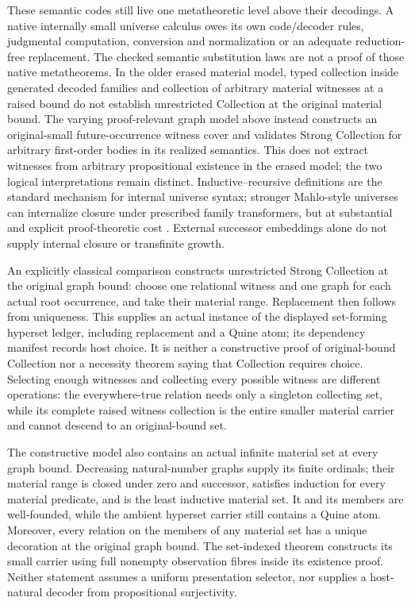 \documentclass[11pt]{article}
\theoremstyle{definition}
\theoremstyle{remark}
\begin{document}
These semantic codes still live one metatheoretic level above their decodings.
A native internally small universe calculus owes its own code/decoder rules,
judgmental computation, conversion and normalization or an adequate
reduction-free replacement.  The checked semantic substitution laws are not a
proof of those native metatheorems.  In the older erased material model, typed
collection inside generated decoded families and collection of arbitrary
material witnesses at a raised bound do not establish unrestricted Collection
at the original material bound.  The varying proof-relevant graph model above
instead constructs an original-small future-occurrence witness cover and
validates Strong Collection for arbitrary first-order bodies in its realized
semantics.  This does not extract witnesses from arbitrary propositional
existence in the erased model; the two logical interpretations remain distinct.
Inductive--recursive definitions are the standard mechanism for internal
universe syntax; stronger Mahlo-style universes can internalize closure under
prescribed family transformers, but at substantial and explicit proof-theoretic
cost \cite{SetzerMahlo,DybjerSetzerMahlo}.  External successor embeddings alone
do not supply internal closure or transfinite growth.

An explicitly classical comparison constructs unrestricted Strong Collection
at the original graph bound: choose one relational witness and one graph for
each actual root occurrence, and take their material range.  Replacement then
follows from uniqueness.  This supplies an actual instance of the displayed
set-forming hyperset ledger, including replacement and a Quine atom; its
dependency manifest records host choice.  It is neither a constructive proof
of original-bound Collection nor a necessity theorem saying that Collection
requires choice.  Selecting enough witnesses and collecting every possible
witness are different operations: the everywhere-true relation needs only a
singleton collecting set, while its complete raised witness collection is the
entire smaller material carrier and cannot descend to an original-bound set.

The constructive model also contains an actual infinite material set at every
graph bound.  Decreasing natural-number graphs supply its finite ordinals;
their material range is closed under zero and successor, satisfies induction
for every material predicate, and is the least inductive material set.  It
and its members are well-founded, while the ambient hyperset carrier still
contains a Quine atom.  Moreover, every relation on the members of any
material set has a unique decoration at the original graph bound.  The
set-indexed theorem constructs its small carrier using full nonempty
observation fibres inside its existence proof.  Neither statement assumes
a uniform presentation selector, nor supplies a host-natural decoder from
propositional surjectivity.
\end{document}
